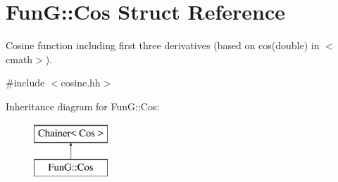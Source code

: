 \hypertarget{structFunG_1_1Cos}{\section{Fun\-G\-:\-:Cos Struct Reference}
\label{structFunG_1_1Cos}
}


Cosine function including first three derivatives (based on cos(double) in $<$cmath$>$).  




{\ttfamily \#include $<$cosine.\-hh$>$}

Inheritance diagram for Fun\-G\-:\-:Cos\-:\begin{figure}[H]
\begin{center}
\leavevmode
\includegraphics[height=2.000000cm]{structFunG_1_1Cos}
\end{center}
\end{figure}
